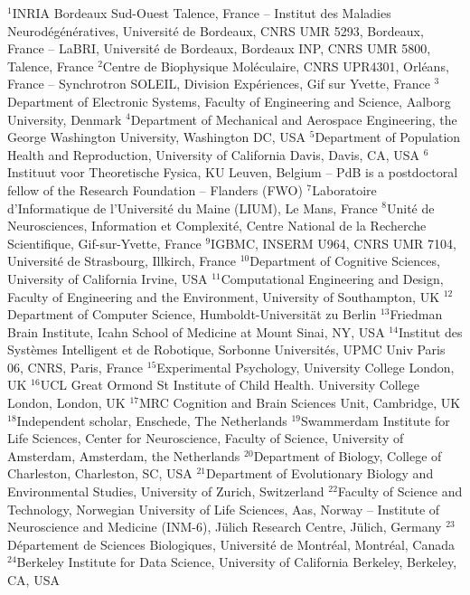 $^{1}$INRIA Bordeaux Sud-Ouest Talence, France – Institut des Maladies Neurodégénératives, Université de Bordeaux, CNRS UMR 5293, Bordeaux, France – LaBRI, Université de Bordeaux, Bordeaux INP, CNRS UMR 5800, Talence, France
$^{2}$Centre de Biophysique Moléculaire, CNRS UPR4301, Orléans, France -- Synchrotron SOLEIL, Division Expériences, Gif sur Yvette, France
$^{3}$Department of Electronic Systems, Faculty of Engineering and Science, Aalborg University, Denmark
$^{4}$Department of Mechanical and Aerospace Engineering, the George Washington University, Washington DC, USA
$^{5}$Department of Population Health and Reproduction, University of California Davis, Davis, CA, USA
$^{6}$Instituut voor Theoretische Fysica, KU Leuven, Belgium -- PdB is a postdoctoral fellow of the Research Foundation -- Flanders (FWO)
$^{7}$Laboratoire d'Informatique de l'Université du Maine (LIUM), Le Mans, France
$^{8}$Unité de Neurosciences, Information et Complexité, Centre National de la Recherche Scientifique, Gif-sur-Yvette, France
$^{9}$IGBMC, INSERM U964, CNRS UMR 7104, Université de Strasbourg, Illkirch, France
$^{10}$Department of Cognitive Sciences, University of California Irvine, USA
$^{11}$Computational Engineering and Design, Faculty of Engineering and the Environment, University of Southampton, UK
$^{12}$Department of Computer Science, Humboldt-Universität zu Berlin
$^{13}$Friedman Brain Institute, Icahn School of Medicine at Mount Sinai, NY, USA
$^{14}$Institut des Systèmes Intelligent et de Robotique, Sorbonne Universités, UPMC Univ Paris 06, CNRS, Paris, France
$^{15}$Experimental Psychology, University College London, UK
$^{16}$UCL Great Ormond St Institute of Child Health. University College London, London, UK
$^{17}$MRC Cognition and Brain Sciences Unit, Cambridge, UK
$^{18}$Independent scholar, Enschede, The Netherlands
$^{19}$Swammerdam Institute for Life Sciences, Center for Neuroscience, Faculty of Science, University of Amsterdam, Amsterdam, the Netherlands
$^{20}$Department of Biology, College of Charleston, Charleston, SC, USA
$^{21}$Department of Evolutionary Biology and Environmental Studies, University of Zurich, Switzerland
$^{22}$Faculty of Science and Technology, Norwegian University of Life Sciences, Aas, Norway -- Institute of Neuroscience and Medicine (INM-6), Jülich Research Centre, Jülich, Germany
$^{23}$Département de Sciences Biologiques, Université de Montréal, Montréal, Canada
$^{24}$Berkeley Institute for Data Science, University of California Berkeley, Berkeley, CA, USA
